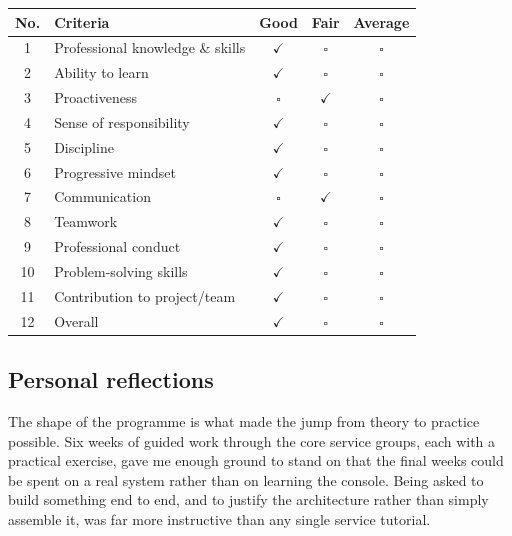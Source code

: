 \begin{center}
\renewcommand{\arraystretch}{1.25}
\begin{tabular}{@{}c>{\raggedright\arraybackslash}p{7.2cm}ccc@{}}
\toprule
\textbf{No.} & \textbf{Criteria} & \textbf{Good} & \textbf{Fair} & \textbf{Average} \\
\midrule
1  & Professional knowledge \& skills & $\checkmark$ & $\square$ & $\square$ \\
2  & Ability to learn                 & $\checkmark$ & $\square$ & $\square$ \\
3  & Proactiveness                    & $\square$ & $\checkmark$ & $\square$ \\
4  & Sense of responsibility          & $\checkmark$ & $\square$ & $\square$ \\
5  & Discipline                       & $\checkmark$ & $\square$ & $\square$ \\
6  & Progressive mindset              & $\checkmark$ & $\square$ & $\square$ \\
7  & Communication                    & $\square$ & $\checkmark$ & $\square$ \\
8  & Teamwork                         & $\checkmark$ & $\square$ & $\square$ \\
9  & Professional conduct             & $\checkmark$ & $\square$ & $\square$ \\
10 & Problem-solving skills           & $\checkmark$ & $\square$ & $\square$ \\
11 & Contribution to project/team     & $\checkmark$ & $\square$ & $\square$ \\
12 & Overall                          & $\checkmark$ & $\square$ & $\square$ \\
\bottomrule
\end{tabular}
\end{center}

\subsection{Personal reflections}

The shape of the programme is what made the jump from theory to practice
possible. Six weeks of guided work through the core service groups, each with a
practical exercise, gave me enough ground to stand on that the final weeks could
be spent on a real system rather than on learning the console. Being asked to
build something end to end, and to justify the architecture rather than simply
assemble it, was far more instructive than any single service tutorial.


